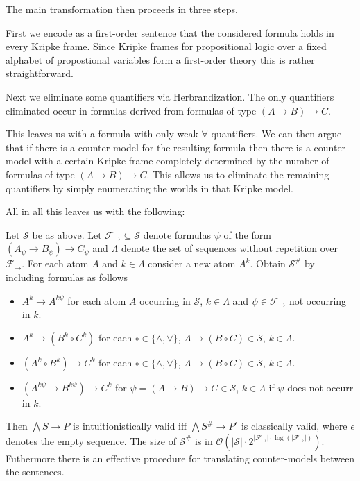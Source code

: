 \documentclass[a4paper,UKenglish,cleveref, autoref, thm-restate]{lipics-v2021}
\begin{document}
The main transformation then proceeds in three steps.

First we encode as a first-order sentence that the considered formula holds in every Kripke frame. Since Kripke frames for propositional logic over a fixed alphabet of propostional variables form a first-order theory this is rather straightforward.

Next we eliminate some quantifiers via Herbrandization. The only quantifiers eliminated occur in formulas derived from formulas of type $(A\to B)\to C$.

This leaves us with a formula with only weak $\forall$-quantifiers. We can then argue that if there is a counter-model for the resulting formula then there is a counter-model with a certain Kripke frame completely determined by the number of formulas of type $(A\to B)\to C$. This allows us to eliminate the remaining quantifiers by simply enumerating the worlds in that Kripke model.

All in all this leaves us with the following:

\begin{theorem}
	Let $\mathcal S$ be as above. Let $\mathcal F_\to\subseteq\mathcal S$ denote formulas $\psi$ of the form $(A_\psi\to B_\psi)\to C_\psi$ and $\Lambda$ denote the set of sequences without repetition over $\mathcal F_\to$. For each atom $A$ and $k\in\Lambda$ consider a new atom $A^k$. Obtain $\mathcal S^\#$ by including formulas as follows
	\begin{itemize}
		\item $A^k\to A^{k\psi}$ for each atom $A$ occurring in $\mathcal S$, $k\in\Lambda$ and $\psi\in\mathcal F_\to$ not occurring in $k$.
		\item $A^k\to (B^k\circ C^k)$ for each $\circ\in\{\wedge,\vee\}$, $A\to (B\circ C)\in\mathcal S$, $k\in\Lambda$.
		\item $(A^k\circ B^k)\to C^k$ for each $\circ\in\{\wedge,\vee\}$, $A\to (B\circ C)\in\mathcal S$, $k\in\Lambda$.
		\item $(A^{k\psi}\to B^{k\psi})\to C^k$ for $\psi = (A\to B)\to C\in\mathcal S$, $k\in\Lambda$ if $\psi$ does not occurr in $k$.
	\end{itemize}
	Then $\bigwedge S\to P$ is intuitionistically valid iff $\bigwedge S^\#\to P^\epsilon$ is classically valid, where $\epsilon$ denotes the empty sequence. The size of $\mathcal S^\#$ is in $\mathcal O(|\mathcal S|\cdot2^{|\mathcal F_\to|\cdot\log(|\mathcal F_\to|)})$. Futhermore there is an effective procedure for translating counter-models between the sentences.
\end{theorem}
\end{document}
